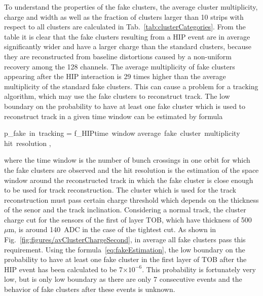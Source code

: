 To understand the properties of the fake clusters, the average cluster multiplicity, charge and width as well as the fraction of clusters larger than 10 strips with respect to all clusters are calculated in Tab.~\ref{tab:clusterCategories}. From the table it is clear that the fake clusters resulting from a HIP event are in average significantly wider and have a larger charge than the standard clusters, because they are reconstructed from baseline distortions caused by a non-uniform recovery among the 128 channels. The average multiplicity of fake clusters appearing after the HIP interaction is 29 times higher than the average multiplicity of the standard fake clusters. This can cause a problem for a tracking algorithm, which may use the fake clusters to reconstruct track. The low boundary on the probability to have at least one fake cluster which is used to reconstruct track in a given time window can be estimated by formula


{
   p_{fake~in~tracking} = f_{HIP}\times time~window  \times average~fake~cluster~multiplicity \times hit~resolution ,
}

where the time window is the number of bunch crossings in one orbit for which the fake clusters are observed and the hit resolution is the estimation of the space window around the reconstructed track in which the fake cluster is close enough to be used for track reconstruction. The cluster which is used for the track reconstruction must pass certain charge threshold which depends on the thickness of the senor and the track inclination. Considering a normal track, the cluster charge cut for the sensors of the first of layer TOB, which have thickness of 500~$\mu$m, is around 140~ADC in the case of the tightest cut. As shown in Fig.~\ref{fig:figures/avClusterChargeSecond}, in average all fake clusters pass this requirement. Using the formula~\ref{eq:fakeEstimation}, the low boundary on the probability to have at least one fake cluster in the first layer of TOB after the HIP event has been calculated to be 7$\times 10^{-6}$. This probability is fortunately very low, but is only low boundary as there are only 7 consecutive events and the behavior of fake clusters after these events is unknown.



